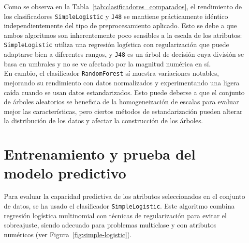 \documentclass{article}
\begin{document}
\vspace{0.5em}

Como se observa en la Tabla~\ref{tab:clasificadores_comparados}, el rendimiento de los clasificadores \texttt{SimpleLogistic} y \texttt{J48} se mantiene prácticamente idéntico independientemente del tipo de preprocesamiento aplicado. Esto se debe a que ambos algoritmos son inherentemente poco sensibles a la escala de los atributos: \texttt{SimpleLogistic} utiliza una regresión logística con regularización que puede adaptarse bien a diferentes rangos, y \texttt{J48} es un árbol de decisión cuya división se basa en umbrales y no se ve afectado por la magnitud numérica en sí.\\

En cambio, el clasificador \texttt{RandomForest} sí muestra variaciones notables, mejorando su rendimiento con datos normalizados y experimentando una ligera caída cuando se usan datos estandarizados. Esto puede deberse a que el conjunto de árboles aleatorios se beneficia de la homogeneización de escalas para evaluar mejor las características, pero ciertos métodos de estandarización pueden alterar la distribución de los datos y afectar la construcción de los árboles.\\


\section{Entrenamiento y prueba del modelo predictivo}

Para evaluar la capacidad predictiva de los atributos seleccionados en el conjunto de datos, se ha usado el clasificador \texttt{SimpleLogistic}. Este algoritmo combina regresión logística multinomial con técnicas de regularización para evitar el sobreajuste, siendo adecuado para problemas multiclase y con atributos numéricos (ver Figura~\ref{fig:simple-logistic}).\\
\end{document}
